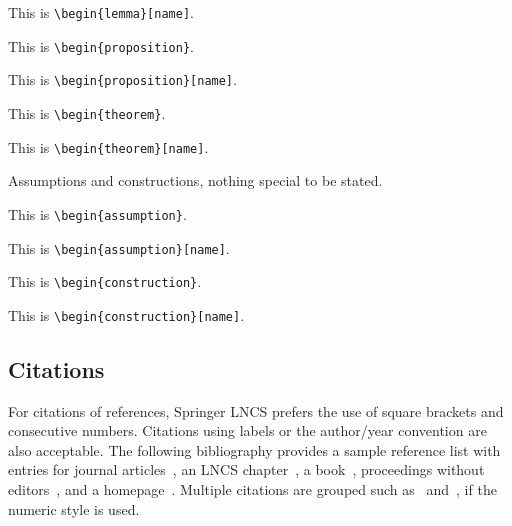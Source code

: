 \begin{lemma}[name]
This is \texttt{\textbackslash begin\{lemma\}[name]}.
\end{lemma}

\begin{proposition}
This is \texttt{\textbackslash begin\{proposition\}}.
\end{proposition}

\begin{proposition}[name]
This is \texttt{\textbackslash begin\{proposition\}[name]}.
\end{proposition}

\begin{theorem}
This is \texttt{\textbackslash begin\{theorem\}}.
\end{theorem}

\begin{theorem}[name]\label{thm:theorem10}
This is \texttt{\textbackslash begin\{theorem\}[name]}.
\end{theorem}

\noindent
Assumptions and constructions, nothing special to be stated.

\begin{assumption}
This is \texttt{\textbackslash begin\{assumption\}}.
\end{assumption}

\begin{assumption}[name]
This is \texttt{\textbackslash begin\{assumption\}[name]}.
\end{assumption}

\begin{construction}
This is \texttt{\textbackslash begin\{construction\}}.
\end{construction}

\begin{construction}[name]
This is \texttt{\textbackslash begin\{construction\}[name]}.
\end{construction}

\subsection{Citations}

For citations of references, Springer LNCS prefers the use of square brackets
and consecutive numbers. Citations using labels or the author/year
convention are also acceptable. The following bibliography provides
a sample reference list with entries for journal
articles~\cite{ref_article1}, an LNCS chapter~\cite{ref_lncs1}, a
book~\cite{ref_book1}, proceedings without editors~\cite{ref_proc1},
and a homepage~\cite{ref_url1}. Multiple citations are grouped
such as~\cite{ref_article1,ref_lncs1,ref_book1}
and~\cite{ref_article1,ref_book1,ref_proc1,ref_url1},
if the numeric style is used.

